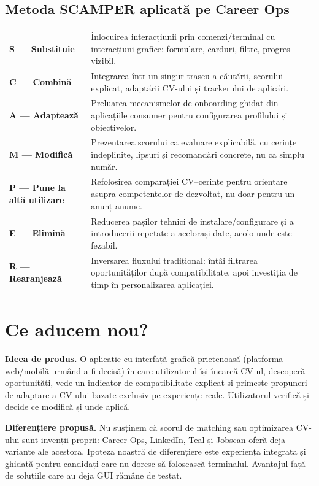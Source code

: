 \documentclass[12pt,a4paper]{article}
\begin{document}
\subsection{Metoda SCAMPER aplicată pe Career Ops}
\begin{tabularx}{\textwidth}{>{\bfseries}p{2.65cm}X}
\toprule
S --- Substituie & Înlocuirea interacțiunii prin comenzi/terminal cu interacțiuni grafice: formulare, carduri, filtre, progres vizibil.\\
C --- Combină & Integrarea într-un singur traseu a căutării, scorului explicat, adaptării CV-ului și trackerului de aplicări.\\
A --- Adaptează & Preluarea mecanismelor de onboarding ghidat din aplicațiile consumer pentru configurarea profilului și obiectivelor.\\
M --- Modifică & Prezentarea scorului ca evaluare explicabilă, cu cerințe îndeplinite, lipsuri și recomandări concrete, nu ca simplu număr.\\
P --- Pune la altă utilizare & Refolosirea comparației CV--cerințe pentru orientare asupra competențelor de dezvoltat, nu doar pentru un anunț anume.\\
E --- Elimină & Reducerea pașilor tehnici de instalare/configurare și a introducerii repetate a acelorași date, acolo unde este fezabil.\\
R --- Rearanjează & Inversarea fluxului tradițional: întâi filtrarea oportunităților după compatibilitate, apoi investiția de timp în personalizarea aplicației.\\
\bottomrule
\end{tabularx}

\section{Ce aducem nou?}
\textbf{Ideea de produs.} O aplicație cu interfață grafică prietenoasă (platforma web/mobilă urmând a fi decisă) în care utilizatorul își încarcă CV-ul, descoperă oportunități, vede un indicator de compatibilitate explicat și primește propuneri de adaptare a CV-ului bazate exclusiv pe experiențe reale. Utilizatorul verifică și decide ce modifică și unde aplică.

\textbf{Diferențiere propusă.} Nu susținem că scorul de matching sau optimizarea CV-ului sunt invenții proprii: Career Ops, LinkedIn, Teal și Jobscan oferă deja variante ale acestora. Ipoteza noastră de diferențiere este experiența integrată și ghidată pentru candidați care nu doresc să folosească terminalul. Avantajul față de soluțiile care au deja GUI rămâne de testat.
\end{document}
